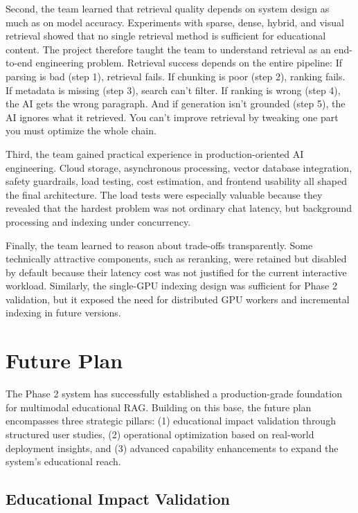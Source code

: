 Second, the team learned that retrieval quality depends on system design as much as on model accuracy. Experiments with sparse, dense, hybrid, and visual retrieval showed that no single retrieval method is sufficient for educational content. The project therefore taught the team to understand retrieval as an end-to-end engineering problem. Retrieval success depends on the entire pipeline: If parsing is bad (step 1), retrieval fails. If chunking is poor (step 2), ranking fails. If metadata is missing (step 3), search can't filter. If ranking is wrong (step 4), the AI gets the wrong paragraph. And if generation isn't grounded (step 5), the AI ignores what it retrieved. You can't improve retrieval by tweaking one part you must optimize the whole chain.

Third, the team gained practical experience in production-oriented AI engineering. Cloud storage, asynchronous processing, vector database integration, safety guardrails, load testing, cost estimation, and frontend usability all shaped the final architecture. The load tests were especially valuable because they revealed that the hardest problem was not ordinary chat latency, but background processing and indexing under concurrency.

Finally, the team learned to reason about trade-offs transparently. Some technically attractive components, such as reranking, were retained but disabled by default because their latency cost was not justified for the current interactive workload. Similarly, the single-GPU indexing design was sufficient for Phase 2 validation, but it exposed the need for distributed GPU workers and incremental indexing in future versions.

\section{Future Plan}

The Phase 2 system has successfully established a production-grade foundation for multimodal educational RAG. Building on this base, the future plan encompasses three strategic pillars: (1) educational impact validation through structured user studies, (2) operational optimization based on real-world deployment insights, and (3) advanced capability enhancements to expand the system's educational reach.

\subsection{Educational Impact Validation}

